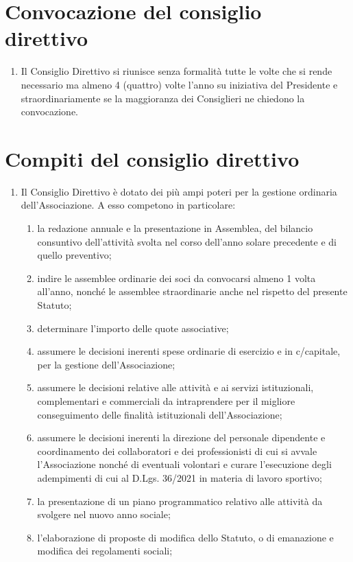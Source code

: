 \documentclass{djtsasddoc}
\begin{document}
	\section{Convocazione del consiglio direttivo}
	\begin{enumerate}
		\item Il Consiglio Direttivo si riunisce senza formalità tutte le volte che si rende necessario ma almeno 4 (quattro) volte l'anno su iniziativa del Presidente e straordinariamente se la maggioranza dei Consiglieri ne chiedono la convocazione.
	\end{enumerate}
	
	\section{Compiti del consiglio direttivo}
	\begin{enumerate}
		\item Il Consiglio Direttivo è dotato dei più ampi poteri per la gestione ordinaria dell'Associazione. A esso competono in particolare:
		\begin{enumerate}
			\item la redazione annuale e la presentazione in Assemblea, del bilancio consuntivo dell'attività svolta nel corso dell'anno solare precedente e di quello preventivo;
			\item indire le assemblee ordinarie dei soci da convocarsi almeno 1 volta all'anno, nonché le assemblee straordinarie anche nel rispetto del presente Statuto;
			\item determinare l'importo delle quote associative;
			\item assumere le decisioni inerenti spese ordinarie di esercizio e in c/capitale, per la gestione dell'Associazione;
			\item assumere le decisioni relative alle attività e ai servizi istituzionali, complementari e commerciali da intraprendere per il migliore conseguimento delle finalità istituzionali dell'Associazione;
			\item assumere le decisioni inerenti la direzione del personale dipendente e coordinamento dei collaboratori e dei professionisti di cui si avvale l'Associazione nonché di eventuali volontari e curare l'esecuzione degli adempimenti di cui al D.Lgs. 36/2021 in materia di lavoro sportivo;
			\item la presentazione di un piano programmatico relativo alle attività da svolgere nel nuovo anno sociale;
			\item l'elaborazione di proposte di modifica dello Statuto, o di emanazione e modifica dei regolamenti sociali;

\end{enumerate}
\end{enumerate}
\end{document}
